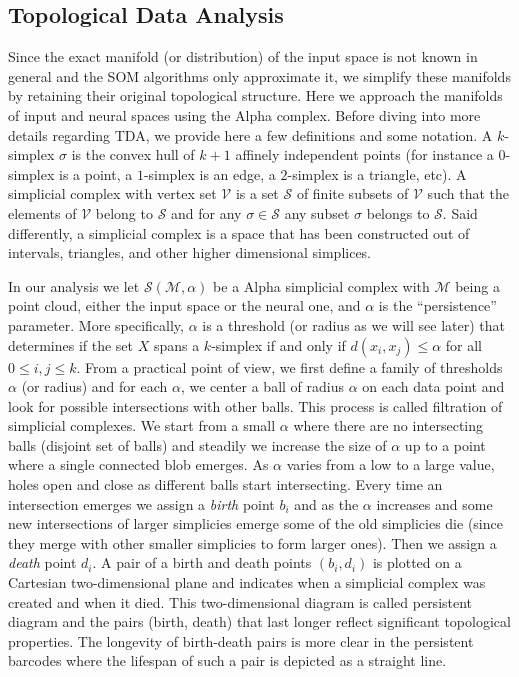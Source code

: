 \subsection{Topological Data Analysis}
\label{sec:si_tda}
Since the exact manifold (or distribution) of the input space is not
known in general and the SOM algorithms only approximate it, we
simplify these manifolds by retaining their original topological
structure. Here we approach the manifolds of input and neural spaces
using the Alpha complex. Before diving into more details regarding
TDA, we provide here a few definitions and some notation. A
$k$-simplex $\sigma$ is the convex hull of $k+1$ affinely independent
points (for instance a $0$-simplex is a point, a $1$-simplex is an
edge, a $2$-simplex is a triangle, etc). A simplicial complex with
vertex set $\mathcal{V}$ is a set $\mathcal{S}$ of finite subsets of
$\mathcal{V}$ such that the elements of $\mathcal{V}$ belong to
$\mathcal{S}$ and for any $\sigma \in \mathcal{S}$ any subset $\sigma$
belongs to $\mathcal{S}$. Said differently, a simplicial complex is a
space that has been constructed out of intervals, triangles, and other
higher dimensional simplices.

In our analysis we let $\mathcal{S}(\mathcal{M}, \alpha)$ be a Alpha
simplicial complex with $\mathcal{M}$ being a point cloud, either the
input space or the neural one, and $\alpha$ is the ``persistence''
parameter.  More specifically, $\alpha$ is a threshold (or radius as
we will see later) that determines if the set $X$ spans a $k$-simplex
if and only if $d(x_i, x_j) \leq \alpha$ for all $0 \leq i, j \leq
k$. From a practical point of view, we first define a family of
thresholds $\alpha$ (or radius) and for each $\alpha$, we center a
ball of radius $\alpha$ on each data point and look for possible
intersections with other balls. This process is called filtration of
simplicial complexes. We start from a small $\alpha$ where there are
no intersecting balls (disjoint set of balls) and steadily we increase
the size of $\alpha$ up to a point where a single connected blob
emerges. As $\alpha$ varies from a low to a large value, holes open
and close as different balls start intersecting. Every time an
intersection emerges we assign a {\em birth} point $b_i$ and as the
$\alpha$ increases and some new intersections of larger simplicies
emerge some of the old simplicies die (since they merge with other
smaller simplicies to form larger ones). Then we assign a {\em death}
point $d_i$. A pair of a birth and death points $(b_i, d_i)$ is
plotted on a Cartesian two-dimensional plane and indicates when a
simplicial complex was created and when it died. This two-dimensional
diagram is called persistent diagram and the pairs (birth, death) that
last longer reflect significant topological properties.  The longevity
of birth-death pairs is more clear in the persistent barcodes where
the lifespan of such a pair is depicted as a straight line.

